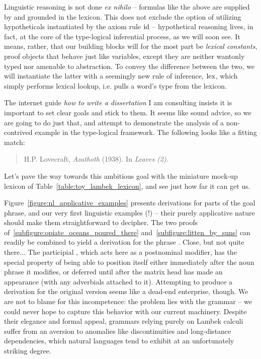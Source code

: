 Linguistic reasoning is not done \textit{ex nihilo} -- formulas like the above are supplied by and grounded in the lexicon. 
This does not exclude the option of utilizing hypotheticals instantiated by the axiom rule $\mathrm{id}$ -- hypothetical reasoning lives, in fact, at the core of the type-logical inferential process, as we will soon see.
It means, rather, that our building blocks will for the most part be \textit{lexical constants}, proof objects that behave just like variables, except they are neither wantonly typed nor amenable to abstraction.
To convey the difference between the two, we will instantiate the latter with a seemingly new rule of inference, $\mathrm{lex}$, which simply performs lexical lookup, i.e. pulls a word's type from the lexicon.

The internet guide \textit{how to write a dissertation} I am consulting insists it is important to set clear goals and stick to them.
It seems like sound advice, so we are going to do just that, and attempt to demonstrate the analysis of a non-contrived example in the type-logical framework.
The following looks like a fitting match:
\begin{quote}
\begin{flushright} H.P. Lovecraft, \textit{Azathoth}  (1938). In \textit{Leaves (2).}\end{flushright}
\end{quote}
Let's pave the way towards this ambitious goal with the miniature mock-up lexicon of Table~\ref{table:toy_lambek_lexicon}, and see just how far it can get us.

Figure~\ref{figure:nl_applicative_examples} presents derivations for parts of the goal phrase, and our very first linguistic examples (!) -- their purely applicative nature should make them straightforward to decipher.
The two proofs of~\ref{subfigure:opiate_oceans_poured_there} and~\ref{subfigure:litten_by_suns} can readily be combined to yield a derivation for the phrase . 
Close, but not quite there...
The participial , which acts here as a postnominal modifier, has the special property of being able to position itself either immediately after the noun phrase  it modifies, or deferred until after the matrix head  has made an appearance (with any adverbials attached to it).
Attempting to produce a derivation for the original version seems like a dead-end enterprise, though.
We are not to blame for this incompetence: the problem lies with the grammar -- we could never hope to capture this behavior with our current machinery.
Despite their elegance and formal appeal, grammars relying purely on Lambek calculi suffer from an aversion to anomalies like discontinuities and long-distance dependencies, which natural languages tend to exhibit at an unfortunately striking degree.

